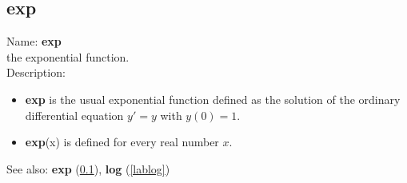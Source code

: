 \subsection{exp}
\label{labexp}
\noindent Name: \textbf{exp}\\
the exponential function.\\
\noindent Description: \begin{itemize}

\item \textbf{exp} is the usual exponential function defined as the solution of the
   ordinary differential equation $y'=y$ with $y(0)=1$.

\item \textbf{exp}(x) is defined for every real number $x$.
\end{itemize}
See also: \textbf{exp} (\ref{labexp}), \textbf{log} (\ref{lablog})
